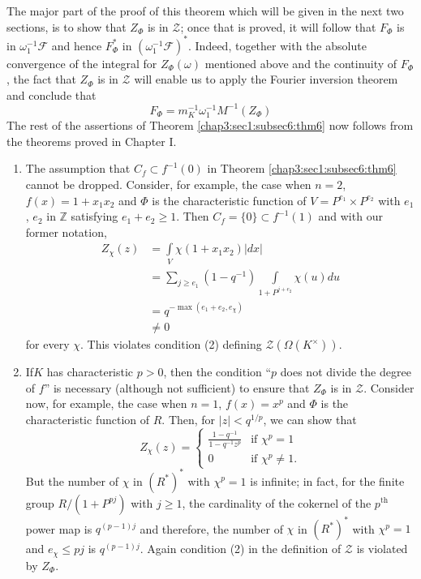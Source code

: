 The major part of the proof of this theorem which will be given in the
next two sections, is to show that $Z_{\Phi}$ is in $\mathscr{Z}$;
once that is proved, it will follow that $F_{\Phi}$ is in
$\omega^{-1}_{1}\mathscr{F}$ and hence $F^{\ast}_{\Phi}$ in
$(\omega^{-1}_{1}\mathscr{F})^{\ast}$. Indeed, together with the
absolute convergence of the integral for $Z_{\Phi}(\omega)$ mentioned
above and the continuity of $F_{\Phi}$, the fact that $Z_{\Phi}$ is in
$\mathscr{Z}$ will enable us to apply the Fourier inversion theorem
and conclude that
$$
F_{\Phi}=m^{-1}_{K}\omega^{-1}_{1}M^{-1}(Z_{\Phi})
$$
The rest of the assertions of Theorem \ref{chap3:sec1:subsec6:thm6} now follows from
the theorems proved in Chapter I.

\begin{Remarks*}
\begin{enumerate}
\renewcommand{\labelenumi}{\theenumi)}
\item The assumption that $C_{f}\subset f^{-1}(0)$ in Theorem
  \ref{chap3:sec1:subsec6:thm6} cannot be dropped. Consider, for example, the case when
  $n=2$, $f(x)=1+x_{1}x_{2}$ and $\Phi$ is the characteristic function
  of $V=P^{e_{1}}\times P^{e_{2}}$ with $e_{1}$, $e_{2}$ in
  $\mathbb{Z}$ satisfying $e_{1}+e_{2}\geq 1$. Then
  $C_{f}=\{0\}\subset f^{-1}(1)$ and with our former notation,
\begin{align*}
Z_{\chi}(z) &= \int\limits_{V}\chi(1+x_{1}x_{2})|dx|\\
&= \sum\limits_{j\geq
  e_{1}}(1-q^{-1})\int\limits_{1+P^{j+e_{2}}}\chi(u)du\\
&= q^{-\max(e_{1}+e_{2},e_{\chi})}\\
&\neq 0
\end{align*}
for every $\chi$. This violates condition (2) defining
$\mathscr{Z}(\Omega(K^{\times}))$. 

\item If\pageoriginale $K$ has characteristic $p>0$, then the
  condition ``$p$ does 
  not divide the degree of $f$'' is necessary (although not
  sufficient) to ensure that $Z_{\Phi}$ is in $\mathscr{Z}$. Consider
  now, for example, the case when $n=1$, $f(x)=x^{p}$ and $\Phi$ is
  the characteristic function of $R$. Then, for $|z|<q^{1/p}$, we can
  show that
$$
Z_{\chi}(z)=
\begin{cases}
\frac{1-q^{-1}}{1-q^{-1}z^{p}} & \text{if \ } \chi^{p}=1\\
0 & \text{if \ } \chi^{p}\neq 1.
\end{cases}
$$
But the number of $\chi$ in $(R^{\ast})^{\ast}$ with $\chi^{p}=1$ is
infinite; in fact, for the finite group $R/(1+P^{pj})$ with $j\geq 1$,
the cardinality of the cokernel of the $p^{\text{th}}$ power map is
$q^{(p-1)j}$ and therefore, the number of $\chi$ in
$(R^{\ast})^{\ast}$ with $\chi^{p}=1$ and $e_{\chi}\leq pj$ is
$q^{(p-1)j}$. Again condition (2) in the definition of
$\mathscr{Z}$ is violated by $Z_{\Phi}$.
\end{enumerate}
\end{Remarks*}

